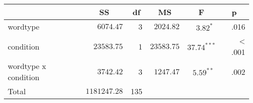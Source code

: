 \begin{center}
\begin{tabular}{lrrrrr}
\toprule
 & \multicolumn{1}{c}{\textbf{SS}} & \multicolumn{1}{c}{\textbf{df}} & \multicolumn{1}{c}{\textbf{MS}} & \multicolumn{1}{c}{\textbf{F}} & \multicolumn{1}{c}{\textbf{p}} \\
\midrule
wordtype & $6074.47$ & 3 & $2024.82$ & $3.82^{*  \ \ }$ & .016 \\
condition & $23583.75$ & 1 & $23583.75$ & $37.74^{***}$ & < .001 \\
wordtype x condition & $3742.42$ & 3 & $1247.47$ & $5.59^{** \ }$ & .002 \\
\midrule
Total & $1181247.28$ & 135 \\
\bottomrule
\end{tabular}
\end{center}